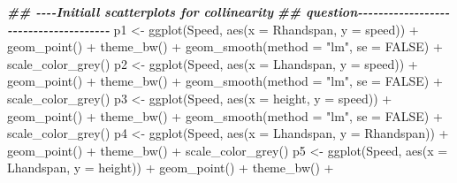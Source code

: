 \documentclass[
]{gitbook}
\newenvironment{Shaded}{\begin{snugshade}}{\end{snugshade}}
\newcommand{\AttributeTok}[1]{\textcolor[rgb]{0.77,0.63,0.00}{#1}}
\newcommand{\ConstantTok}[1]{\textcolor[rgb]{0.00,0.00,0.00}{#1}}
\newcommand{\DocumentationTok}[1]{\textcolor[rgb]{0.56,0.35,0.01}{\textbf{\textit{#1}}}}
\newcommand{\FunctionTok}[1]{\textcolor[rgb]{0.00,0.00,0.00}{#1}}
\newcommand{\NormalTok}[1]{#1}
\newcommand{\OtherTok}[1]{\textcolor[rgb]{0.56,0.35,0.01}{#1}}
\newcommand{\SpecialCharTok}[1]{\textcolor[rgb]{0.00,0.00,0.00}{#1}}
\newcommand{\StringTok}[1]{\textcolor[rgb]{0.31,0.60,0.02}{#1}}
\begin{document}
\begin{Shaded}
\begin{Highlighting}[]
\DocumentationTok{\#\# {-}{-}{-}{-}Initiall scatterplots for collinearity}
\DocumentationTok{\#\# question{-}{-}{-}{-}{-}{-}{-}{-}{-}{-}{-}{-}{-}{-}{-}{-}{-}{-}{-}{-}{-}{-}{-}{-}{-}{-}{-}{-}{-}{-}{-}{-}{-}{-}{-}{-}{-}{-}}
\NormalTok{p1 }\OtherTok{\textless{}{-}} \FunctionTok{ggplot}\NormalTok{(Speed, }\FunctionTok{aes}\NormalTok{(}\AttributeTok{x =}\NormalTok{ Rhandspan, }\AttributeTok{y =}\NormalTok{ speed)) }\SpecialCharTok{+} \FunctionTok{geom\_point}\NormalTok{() }\SpecialCharTok{+} \FunctionTok{theme\_bw}\NormalTok{() }\SpecialCharTok{+}
    \FunctionTok{geom\_smooth}\NormalTok{(}\AttributeTok{method =} \StringTok{"lm"}\NormalTok{, }\AttributeTok{se =} \ConstantTok{FALSE}\NormalTok{) }\SpecialCharTok{+} \FunctionTok{scale\_color\_grey}\NormalTok{()}
\NormalTok{p2 }\OtherTok{\textless{}{-}} \FunctionTok{ggplot}\NormalTok{(Speed, }\FunctionTok{aes}\NormalTok{(}\AttributeTok{x =}\NormalTok{ Lhandspan, }\AttributeTok{y =}\NormalTok{ speed)) }\SpecialCharTok{+} \FunctionTok{geom\_point}\NormalTok{() }\SpecialCharTok{+} \FunctionTok{theme\_bw}\NormalTok{() }\SpecialCharTok{+}
    \FunctionTok{geom\_smooth}\NormalTok{(}\AttributeTok{method =} \StringTok{"lm"}\NormalTok{, }\AttributeTok{se =} \ConstantTok{FALSE}\NormalTok{) }\SpecialCharTok{+} \FunctionTok{scale\_color\_grey}\NormalTok{()}
\NormalTok{p3 }\OtherTok{\textless{}{-}} \FunctionTok{ggplot}\NormalTok{(Speed, }\FunctionTok{aes}\NormalTok{(}\AttributeTok{x =}\NormalTok{ height, }\AttributeTok{y =}\NormalTok{ speed)) }\SpecialCharTok{+} \FunctionTok{geom\_point}\NormalTok{() }\SpecialCharTok{+} \FunctionTok{theme\_bw}\NormalTok{() }\SpecialCharTok{+} \FunctionTok{geom\_smooth}\NormalTok{(}\AttributeTok{method =} \StringTok{"lm"}\NormalTok{,}
    \AttributeTok{se =} \ConstantTok{FALSE}\NormalTok{) }\SpecialCharTok{+} \FunctionTok{scale\_color\_grey}\NormalTok{()}
\NormalTok{p4 }\OtherTok{\textless{}{-}} \FunctionTok{ggplot}\NormalTok{(Speed, }\FunctionTok{aes}\NormalTok{(}\AttributeTok{x =}\NormalTok{ Lhandspan, }\AttributeTok{y =}\NormalTok{ Rhandspan)) }\SpecialCharTok{+} \FunctionTok{geom\_point}\NormalTok{() }\SpecialCharTok{+} \FunctionTok{theme\_bw}\NormalTok{() }\SpecialCharTok{+}
    \FunctionTok{scale\_color\_grey}\NormalTok{()}
\NormalTok{p5 }\OtherTok{\textless{}{-}} \FunctionTok{ggplot}\NormalTok{(Speed, }\FunctionTok{aes}\NormalTok{(}\AttributeTok{x =}\NormalTok{ Lhandspan, }\AttributeTok{y =}\NormalTok{ height)) }\SpecialCharTok{+} \FunctionTok{geom\_point}\NormalTok{() }\SpecialCharTok{+} \FunctionTok{theme\_bw}\NormalTok{() }\SpecialCharTok{+}

\end{Highlighting}
\end{Shaded}
\end{document}
